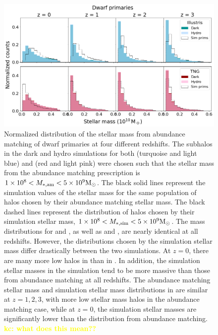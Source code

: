 \documentclass[twocolumn]{aastex631}
\newcommand{\kc}[1]{\textcolor{yellow}{\textbf{kc: #1}} }
\begin{document}
\begin{figure}[htb]
  \centering
  \includegraphics[width=\textwidth]{distributions_stellarmass_dwarf.png}
  \caption{Normalized distribution of the stellar mass from abundance matching of dwarf primaries at four different redshifts. The subhalos in the dark and hydro simulations for both \ill{} (turquoise and light blue) and \tng{} (red and light pink) were chosen such that the stellar mass from the abundance matching prescription is $1\times 10^{8} < M_{*,\mathrm{am}} < 5\times 10^{9} \rm M_\odot$. 
  The black solid lines represent the simulation values of the stellar mass for the same population of halos chosen by their abundance matching stellar mass. 
  The black dashed lines represent the distribution of halos chosen by their simulation stellar mass, $1\times 10^{8} < M_{*,\mathrm{sim}} < 5\times 10^{9} \rm M_\odot$.
  The mass distributions for \illd{} and \illh{}, as well as \tngd{} and \tngh{}, are nearly identical at all redshifts. 
  However, the distributions chosen by the simulation stellar mass differ drastically between the two simulations. At $z=0$, there are many more low \mssim{} halos in \tng{} than in \ill{}. In addition, the simulation stellar masses in the \ill{} simulation tend to be more massive than those from abundance matching at all redshifts. 
  The abundance matching stellar mass and simulation stellar mass distributions in \tng{} are similar at $z=1,2,3$, with more low stellar mass halos in the abundance matching case, while at $z=0$, the simulation stellar masses are significantly lower than the distribution from abundance matching. 
  \kc{what does this mean?? } 
    }
    \label{fig:dist-stellmass-dwarf}
  
\end{figure}
\end{document}
